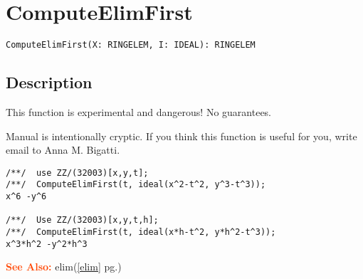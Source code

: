 \documentclass[a4paper]{mybook}
\newenvironment{command}{}{} %
\newcommand\SeeAlso{\par\textcolor{OrangeRed}{\textbf{\large See Also: }}}
\begin{document}
\section{ComputeElimFirst}
\label{ComputeElimFirst}
\begin{command} %


\begin{Verbatim}[label=syntax, rulecolor=\color{MidnightBlue},
frame=single]
ComputeElimFirst(X: RINGELEM, I: IDEAL): RINGELEM
\end{Verbatim}


\subsection*{Description}

This function is experimental and dangerous! No guarantees.
\par 
Manual is intentionally cryptic.
If you think this function is useful for you, write email to Anna M. Bigatti.
\begin{Verbatim}[label=example, rulecolor=\color{PineGreen}, frame=single]
/**/  use ZZ/(32003)[x,y,t];
/**/  ComputeElimFirst(t, ideal(x^2-t^2, y^3-t^3));
x^6 -y^6

/**/  Use ZZ/(32003)[x,y,t,h];
/**/  ComputeElimFirst(t, ideal(x*h-t^2, y*h^2-t^3));
x^3*h^2 -y^2*h^3
\end{Verbatim}


\SeeAlso %
  elim(\ref{elim} pg.\pageref{elim})
\end{command} %
\end{document}
